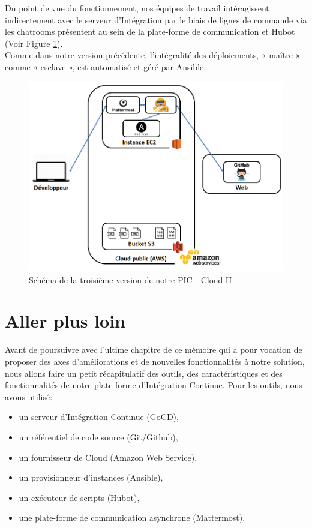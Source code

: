       Du point de vue du fonctionnement, nos équipes de travail intéragissent indirectement avec le serveur d'Intégration par le biais de lignes de commande via les chatrooms présentent au sein de la plate-forme de communication et Hubot (Voir Figure \ref{PICv3}).\\
      Comme dans notre version précédente, l'intégralité des déploiements, « maître » comme « esclave », est automatisé et géré par Ansible.

      \begin{figure}
        \begin{center}
          \includegraphics[scale=0.5]{images/PICv3.png}
        \end{center}
        \caption{Schéma de la troisième version de notre PIC - Cloud II}
        \label{PICv3}
      \end{figure}

      \section{Aller plus loin}
      Avant de poursuivre avec l'ultime chapitre de ce mémoire qui a pour vocation de proposer des axes d'améliorations et de nouvelles fonctionnalités à notre solution, nous allons faire un petit récapitulatif des outils, des caractéristiques et des fonctionnalités de notre plate-forme d'Intégration Continue. Pour les outils, nous avons utilisé:\\

      \begin{itemize}
        \item un serveur d'Intégration Continue (GoCD),
        \item un référentiel de code source (Git/Github),
        \item un fournisseur de Cloud (Amazon Web Service),
        \item un provisionneur d'instances (Ansible),
        \item un exécuteur de scripts (Hubot),
        \item une plate-forme de communication asynchrone (Mattermost).\\
      \end{itemize}

